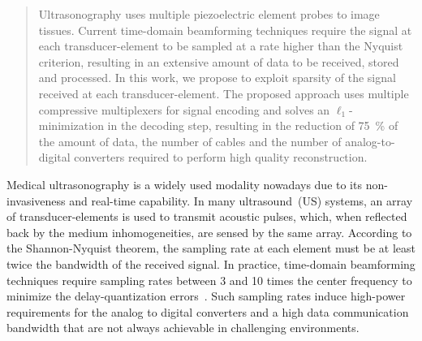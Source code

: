 \documentclass[9pt,conference]{IEEEtran}
\begin{document}




\maketitle


\begin{abstract}
Ultrasonography uses multiple piezoelectric element probes to image tissues. Current time-domain beamforming techniques require the signal at each transducer-element to be sampled at a rate higher than the Nyquist criterion, resulting in an extensive amount of data to be received, stored and processed. In this work, we propose to exploit sparsity of the signal received at each transducer-element. The proposed approach uses multiple compressive multiplexers for signal encoding and solves an $\ell_1$-minimization in the decoding step, resulting in the reduction of \SI{75}{\percent} of the amount of data, the number of cables and the number of analog-to-digital converters required to perform high quality reconstruction.
\end{abstract}





%
\IEEEpeerreviewmaketitle
Medical ultrasonography is a widely used modality nowadays due to its non-invasiveness and real-time capability. In many ultrasound~(US) systems, an array of transducer-elements is used to transmit acoustic pulses, which, when reflected back by the medium inhomogeneities, are sensed by the same array. According to the Shannon-Nyquist theorem, the sampling rate at each element must be at least twice the bandwidth of the received signal. In practice, time-domain beamforming techniques require sampling rates between 3 and 10 times the center frequency to minimize the delay-quantization errors~\cite{szabo2014}. Such sampling rates induce high-power requirements for the analog to digital converters and a high data communication bandwidth that are not always achievable in challenging environments.
\end{document}
